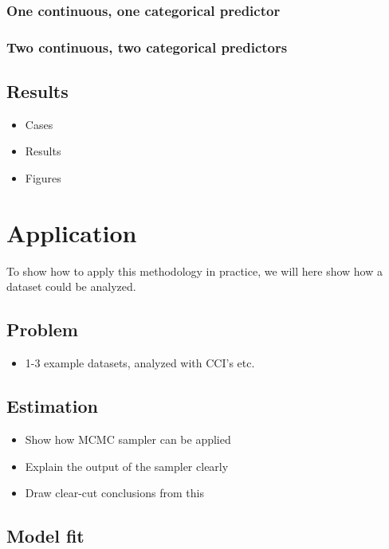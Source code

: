 \documentclass[12pt,a4paper]{article}\usepackage[]{graphicx}\usepackage[]{color}
\begin{document}
\subsubsection{One continuous, one categorical predictor}

\subsubsection{Two continuous, two categorical predictors}

\subsection{Results}






\begin{itemize}
\item Cases
\item Results
\item Figures
\end{itemize}

\section{Application}

To show how to apply this methodology in practice, we will here show how a dataset could be analyzed.

\subsection{Problem}

\begin{itemize}
\item 1-3 example datasets, analyzed with CCI's etc.
\end{itemize}

\subsection{Estimation}

\begin{itemize}
\item Show how MCMC sampler can be applied
\item Explain the output of the sampler clearly
\item Draw clear-cut conclusions from this
\end{itemize}

\subsection{Model fit}
\end{document}
